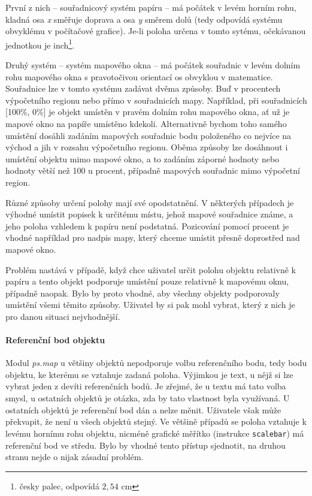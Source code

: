 \documentclass[a4paper,12pt,draft]{article}
\newcommand{\modul}[1]{\emph{#1}}
\newcommand{\instr}[1]{\lstinline[style=psmapInline]|#1|}
\begin{document}
První z nich -- souřadnicový systém papíru -- má počátek v levém horním rohu, kladná osa \emph{x} směřuje doprava a osa \emph{y} směrem dolů (tedy odpovídá systému obvyklému v počítačové grafice). 
Je-li poloha určena v tomto sytému, očekávanou jednotkou je inch\footnote{ česky palec, odpovídá $2{},54$ cm}.

Druhý systém -- systém mapového okna -- má počátek souřadnic v levém dolním rohu mapového okna s pravotočivou orientací os obvyklou v matematice. Souřadnice lze v tomto systému zadávat dvěma způsoby. Buď v procentech výpočetního regionu nebo přímo v souřadnicích mapy. Například, při souřadnicích [100\%, 0\%] je objekt umístěn v pravém dolním rohu mapového okna, ať už je mapové okno na papíře umístěno kdekoli. Alternativně bychom toho samého umístění dosáhli zadáním mapových souřadnic bodu položeného co nejvíce na východ a jih v rozsahu výpočetního regionu. Oběma způsoby lze dosáhnout i umístění objektu mimo mapové okno, a to zadáním záporné hodnoty nebo hodnoty větší než 100 u procent, případně mapových souřadnic mimo výpočetní region.

Různé způsoby určení polohy mají své opodstatnění. V některých případech je výhodné umístit popisek k určitému místu, jehož mapové souřadnice známe, a jeho poloha vzhledem k papíru není podstatná. Pozicování pomocí procent je vhodné například pro nadpis mapy, který chceme umístit přesně doprostřed nad mapové okno. 

Problém nastává v případě, když chce uživatel určit polohu objektu relativně k papíru a tento objekt podporuje umístění pouze relativně k mapovému oknu, případně naopak. Bylo by proto vhodné, aby všechny objekty podporovaly umístění všemi těmito způsoby. Uživatel by si pak mohl vybrat, který z nich je pro danou situaci nejvhodnější.

\paragraph*{Referenční bod objektu}
\label{sec:psmap:referencepoint}
Modul \modul{ps.map} u většiny objektů nepodporuje volbu referenčního bodu, tedy bodu objektu, ke kterému se vztahuje zadaná poloha. Výjimkou je text, u nějž si lze vybrat jeden z devíti referenčních bodů. Je zřejmé, že u textu má tato volba smysl, u ostatních objektů je otázka, zda by tato vlastnost byla využívaná. 
U ostatních objektů je referenční bod dán a nelze měnit. Uživatele však může překvapit, že není u všech objektů stejný. Ve většině případů se poloha vztahuje k levému hornímu rohu objektu, nicméně grafické měřítko (instrukce \instr{scalebar}) má referenční bod ve středu. Bylo by vhodné tento přístup sjednotit, na druhou stranu nejde o nijak zásadní problém. 
\end{document}
